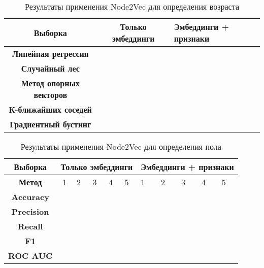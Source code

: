\begin{table}[h!]
\centering
\begin{tabular}{|c|c|l|}
\hline
\textbf{Выборка}                & Только эмбеддинги & Эмбеддинги + признаки \\ \hline
\textbf{Линейная регрессия}     &                   &                       \\ \hline
\textbf{Случайный лес}          &                   &                       \\ \hline
\textbf{Метод опорных векторов} &                   &                       \\ \hline
\textbf{К-ближайших соседей}    &                   &                       \\ \hline
\textbf{Градиентный бустинг}    &                   &                       \\ \hline
\end{tabular}
\caption{Результаты применения Node2Vec для определения возраста}
\label{Node2Vec age table}
\end{table}

\begin{table}[h!]
\centering
\begin{tabular}{|c|c|l|l|l|l|l|l|l|l|l|}
\hline
\textbf{Выборка}   & \multicolumn{5}{c|}{Только эмбеддинги} & \multicolumn{5}{l|}{Эмбеддинги + признаки} \\ \hline
\textbf{Метод}     & 1                      & 2 & 3 & 4 & 5 & 1      & 2      & 3      & 4      & 5      \\ \hline
\textbf{Accuracy}  &                        &   &   &   &   &        &        &        &        &        \\ \hline
\textbf{Precision} &                        &   &   &   &   &        &        &        &        &        \\ \hline
\textbf{Recall}    &                        &   &   &   &   &        &        &        &        &        \\ \hline
\textbf{F1}        &                        &   &   &   &   &        &        &        &        &        \\ \hline
\textbf{ROC AUC}   & \multicolumn{1}{l|}{}  &   &   &   &   &        &        &        &        &        \\ \hline
\end{tabular}
\caption{Результаты применения Node2Vec для определения пола}
\label{Node2Vec gender table}
\end{table}




\clearpage